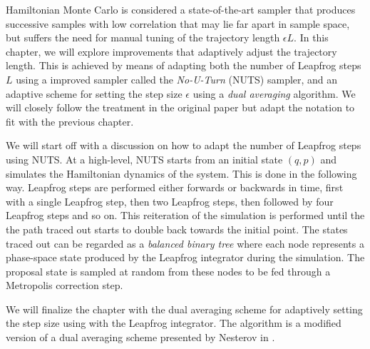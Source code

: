 Hamiltonian Monte Carlo is considered a state-of-the-art sampler that produces successive samples with low correlation
that may lie far apart in sample space, 
but suffers the need for manual tuning of the trajectory length $\epsilon L$. 
In this chapter, we will explore improvements that adaptively adjust the trajectory length. This is achieved by means of adapting both the number of Leapfrog steps $L$ using a improved sampler called the \textit{No-U-Turn} (NUTS) sampler, and an adaptive scheme for setting the step size $\epsilon$ using a \textit{dual averaging} algorithm. We will closely follow the treatment in the original paper \cite{nuts} but adapt the notation to fit with the previous chapter.

We will start off with a discussion on how to adapt the number of Leapfrog steps using NUTS. At a high-level, NUTS starts from an initial state $(q, p)$ and simulates the Hamiltonian dynamics of the system. This is
done in the following way. Leapfrog steps are performed either forwards or backwards in time, first with a single Leapfrog step, then two Leapfrog steps, then followed by four Leapfrog steps and so on. This reiteration of the simulation is performed until the the path traced out starts to double back towards the initial point. The states traced out can be regarded as a \textit{balanced binary tree} where
each node represents a phase-space state produced by the Leapfrog integrator during the simulation. The proposal state is sampled at random from these nodes to be fed through a Metropolis correction step. 

We will finalize the chapter with the dual averaging scheme for adaptively setting the step size using with the Leapfrog integrator. The algorithm is a modified version of a dual averaging scheme presented by Nesterov in \cite{Nesterov2009}.



